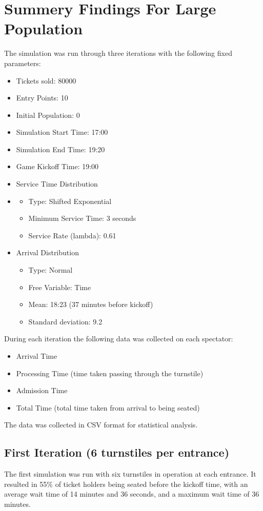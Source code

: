 \documentclass[11pt]{article}
\begin{document}
\section{Summery Findings For Large Population}\label{sec:summery-findings}
The simulation was run through three iterations with the following fixed parameters:
\begin{itemize}
    \item Tickets sold: 80000
    \item Entry Points: 10
    \item Initial Population: 0
    \item Simulation Start Time: 17:00
    \item Simulation End Time: 19:20
    \item Game Kickoff Time: 19:00
    \item Service Time Distribution
    \item \begin{itemize}
              \item Type: Shifted Exponential
              \item Minimum Service Time: 3 seconds
              \item Service Rate (lambda): 0.61
    \end{itemize}
    \item Arrival Distribution
    \begin{itemize}
        \item Type: Normal
        \item Free Variable: Time
        \item Mean: 18:23 (37 minutes before kickoff)
        \item Standard deviation: 9.2
    \end{itemize}
\end{itemize}
    During each iteration the following data was collected on each spectator:
\begin{itemize}
    \item Arrival Time
    \item Processing Time (time taken passing through the turnstile)
    \item Admission Time
    \item Total Time (total time taken from arrival to being seated)
\end{itemize}
    The data was collected in CSV format for statistical analysis.
\subsection{First Iteration (6 turnstiles per entrance)}
    The first simulation was run with six turnstiles in operation at each entrance.
    It resulted in 55\% of ticket holders being seated before the kickoff time, with an average wait time of 14 minutes
    and 36 seconds, and a maximum wait time of 36 minutes.
\end{document}
